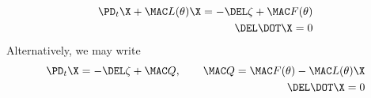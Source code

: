 \documentclass[11pt]{article}
\begin{document}
\begin{equation}\begin{aligned}
  \PD_t \X + \MAC L(\theta) \X = - \DEL \zeta + \MAC F(\theta) \\
  \DEL \DOT \X = 0
\end{aligned}\end{equation}
Alternatively, we may write
\begin{equation}\begin{aligned}
  \PD_t \X = - \DEL \zeta + \MAC Q, \qquad \MAC Q = \MAC F(\theta) - \MAC L(\theta) \X \\
  \DEL \DOT \X = 0
\end{aligned}\end{equation}
\end{document}
